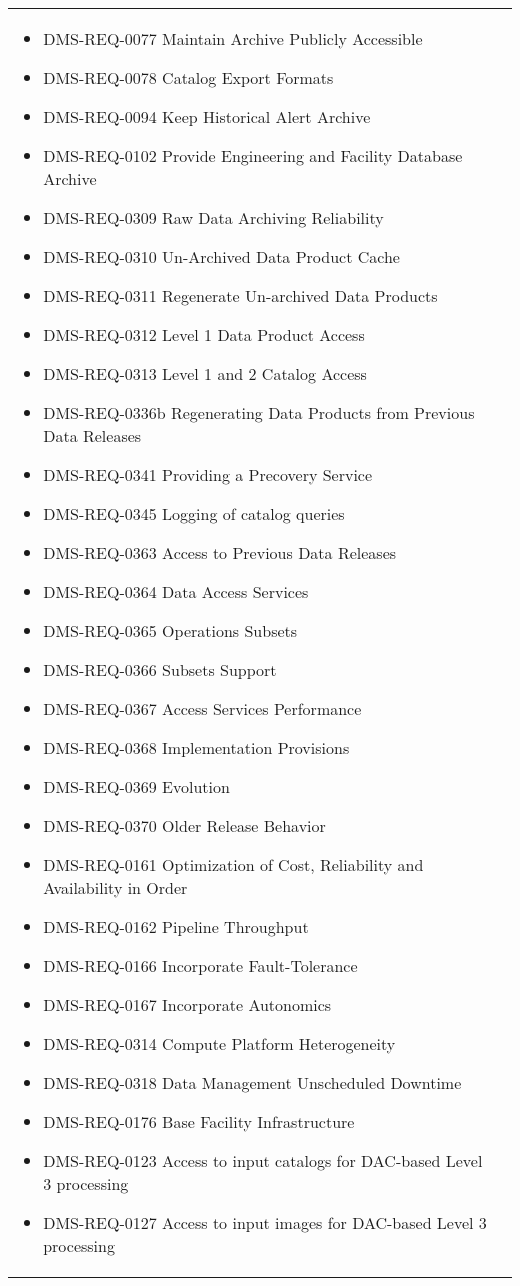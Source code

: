 \begin{xtabular}{lp{0.7\textwidth}}
\begin{itemize}
\item DMS-REQ-0077 Maintain Archive Publicly Accessible
\item DMS-REQ-0078 Catalog Export Formats
\item DMS-REQ-0094 Keep Historical Alert Archive
\item DMS-REQ-0102 Provide Engineering and Facility Database Archive
\item DMS-REQ-0309 Raw Data Archiving Reliability
\item DMS-REQ-0310 Un-Archived Data Product Cache
\item DMS-REQ-0311 Regenerate Un-archived Data Products
\item DMS-REQ-0312 Level 1 Data Product Access
\item DMS-REQ-0313 Level 1 and 2 Catalog Access
\item DMS-REQ-0336b Regenerating Data Products from Previous Data Releases
\item DMS-REQ-0341 Providing a Precovery Service
\item DMS-REQ-0345 Logging of catalog queries
\item DMS-REQ-0363 Access to Previous Data Releases
\item DMS-REQ-0364 Data Access Services
\item DMS-REQ-0365 Operations Subsets
\item DMS-REQ-0366 Subsets Support
\item DMS-REQ-0367 Access Services Performance
\item DMS-REQ-0368 Implementation Provisions
\item DMS-REQ-0369 Evolution
\item DMS-REQ-0370 Older Release Behavior
\item DMS-REQ-0161 Optimization of Cost, Reliability and Availability in Order
\item DMS-REQ-0162 Pipeline Throughput
\item DMS-REQ-0166 Incorporate Fault-Tolerance
\item DMS-REQ-0167 Incorporate Autonomics
\item DMS-REQ-0314 Compute Platform Heterogeneity
\item DMS-REQ-0318 Data Management Unscheduled Downtime
\item DMS-REQ-0176 Base Facility Infrastructure
\item DMS-REQ-0123 Access to input catalogs for DAC-based Level 3 processing
\item DMS-REQ-0127 Access to input images for DAC-based Level 3 processing

\end{itemize}
\end{xtabular}
